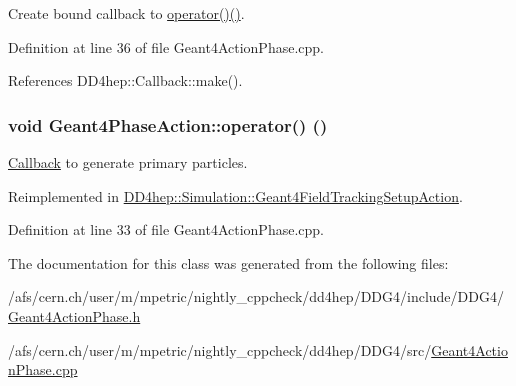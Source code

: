 Create bound callback to \hyperlink{class_d_d4hep_1_1_simulation_1_1_geant4_phase_action_a5d8bac662ec707a8cdff0bd3cdd9b831}{operator()()}. 

Definition at line 36 of file Geant4ActionPhase.cpp.

References DD4hep::Callback::make().\hypertarget{class_d_d4hep_1_1_simulation_1_1_geant4_phase_action_a5d8bac662ec707a8cdff0bd3cdd9b831}{
\subsubsection[{operator()}]{\setlength{\rightskip}{0pt plus 5cm}void Geant4PhaseAction::operator() ()}}
\label{class_d_d4hep_1_1_simulation_1_1_geant4_phase_action_a5d8bac662ec707a8cdff0bd3cdd9b831}


\hyperlink{class_d_d4hep_1_1_callback}{Callback} to generate primary particles. 

Reimplemented in \hyperlink{class_d_d4hep_1_1_simulation_1_1_geant4_field_tracking_setup_action_a5412b262d35a196e35807b2a3fe2463b}{DD4hep::Simulation::Geant4FieldTrackingSetupAction}.

Definition at line 33 of file Geant4ActionPhase.cpp.

The documentation for this class was generated from the following files:\begin{DoxyCompactItemize}
\item 
/afs/cern.ch/user/m/mpetric/nightly\_\-cppcheck/dd4hep/DDG4/include/DDG4/\hyperlink{_geant4_action_phase_8h}{Geant4ActionPhase.h}\item 
/afs/cern.ch/user/m/mpetric/nightly\_\-cppcheck/dd4hep/DDG4/src/\hyperlink{_geant4_action_phase_8cpp}{Geant4ActionPhase.cpp}\end{DoxyCompactItemize}
